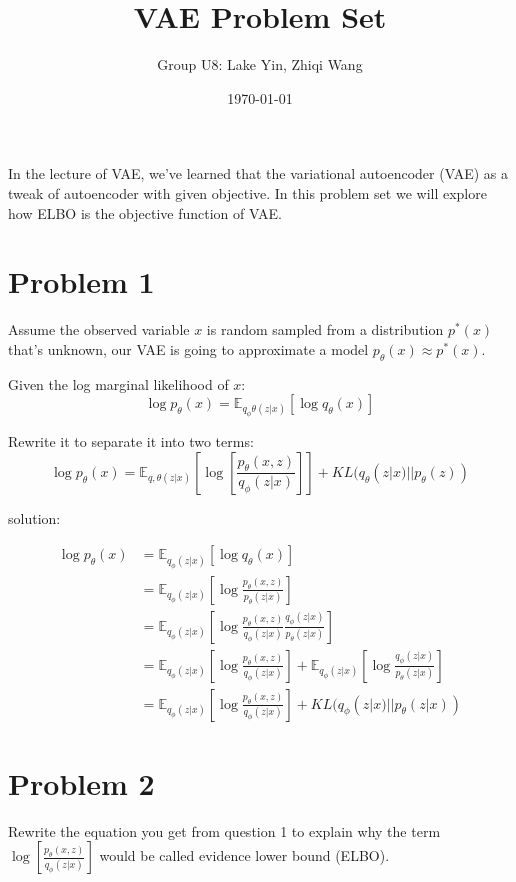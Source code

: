 \documentclass{article}
\begin{document}
\title{\vspace{-3cm}VAE Problem Set}
\author{Group U8: Lake Yin, Zhiqi Wang}
\date{\today}
\maketitle

In the lecture of VAE, we've learned that the variational autoencoder (VAE) as a tweak of autoencoder with given objective. In this problem set we will explore how ELBO is the objective function of VAE.

\section*{Problem 1}
Assume the observed variable $x$ is random sampled from a distribution $p^*(x)$ that's unknown, our VAE is going to approximate a model $p_\theta(x) \approx p^*(x)$.

Given the log marginal likelihood of $x$: $$\log p_\theta (x) = \mathbb{E}_{q_\phi\theta(z|x)}[\log q_\theta (x)]$$

Rewrite it to separate it into two terms: $$\log p_\theta (x) = \mathbb{E}_{q,\theta(z|x)}\left[\log \left[\frac{p_\theta (x,z)}{q_\phi(z|x)}\right]\right] + KL(q_\theta(z|x)||p_\theta(z))$$

solution:

\color{blue}

\begin{align}
    \log p_\theta (x) &= \mathbb{E}_{q_\phi(z|x)}\left[\log q_\theta (x)\right]\\
    &= \mathbb{E}_{q_\phi(z|x)}\left[\log\frac{p_\theta(x,z)}{p_\theta(z|x)}\right]\\
    &= \mathbb{E}_{q_\phi(z|x)}\left[\log\frac{p_\theta(x,z)}{q_\phi(z|x)} \frac{q_\phi(z|x)}{p_\theta(z|x)}\right]\\
    &= \mathbb{E}_{q_\phi(z|x)}\left[\log\frac{p_\theta(x,z)}{q_\phi(z|x)}\right] + \mathbb{E}_{q_\phi(z|x)}\left[\log\frac{q_\phi(z|x)}{p_\theta(z|x)}\right]\\
    &= \mathbb{E}_{q_\phi(z|x)}\left[\log\frac{p_\theta(x,z)}{q_\phi(z|x)}\right] + KL(q_\phi(z|x)||p_\theta(z|x))
\end{align}

\color{black}

\bigskip

\section*{Problem 2}
Rewrite the equation you get from question 1 to explain why the term $\log [\frac{p_\theta (x,z)}{q_\phi(z|x)}]$ would be called evidence lower bound (ELBO).
\end{document}
